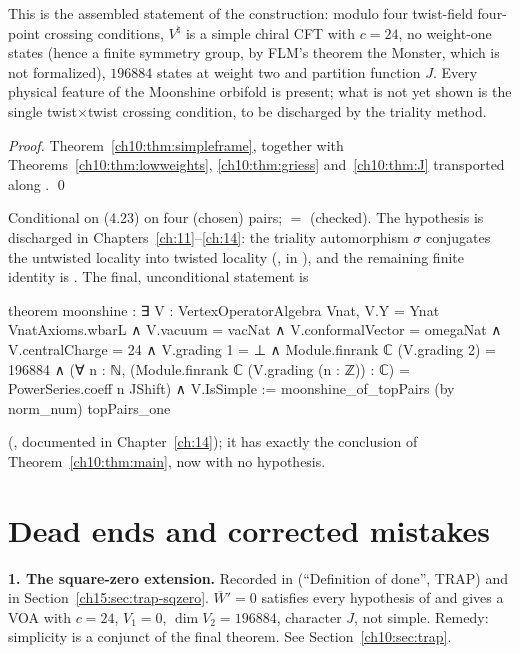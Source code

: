 \begin{physics}
This is the assembled statement of the construction: modulo four twist-field four-point crossing conditions, $V^\natural$ is a simple chiral CFT with $c=24$, no weight-one states (hence a finite symmetry group, by FLM's theorem the Monster, which is not formalized), $196884$ states at weight two and partition function $J$. Every physical feature of the Moonshine orbifold is present; what is not yet shown is the single twist$\times$twist crossing condition, to be discharged by the triality method.
\end{physics}

\emph{Proof.}  Theorem~\ref{ch10:thm:simpleframe}, together with
Theorems~\ref{ch10:thm:lowweights}, \ref{ch10:thm:griess} and~\ref{ch10:thm:J} transported along
. \qed

\begin{status}
Conditional on (4.23) on four (chosen) pairs;  $=$
 (checked).  The hypothesis is discharged in
Chapters~\ref{ch:11}--\ref{ch:14}: the triality automorphism $\sigma$ conjugates the untwisted
locality into twisted locality (,
 in ), and the remaining finite identity is
.  The final, unconditional statement is
\begin{leancode}
theorem moonshine :
    ∃ V : VertexOperatorAlgebra Vnat,
      V.Y = Ynat VnatAxioms.wbarL ∧ V.vacuum = vacNat ∧ V.conformalVector = omegaNat ∧
      V.centralCharge = 24 ∧
      V.grading 1 = ⊥ ∧
      Module.finrank ℂ (V.grading 2) = 196884 ∧
      (∀ n : ℕ, (Module.finrank ℂ (V.grading (n : ℤ)) : ℂ) = PowerSeries.coeff n JShift) ∧
      V.IsSimple :=
  moonshine_of_topPairs (by norm_num) topPairs_one
\end{leancode}
(, documented in Chapter~\ref{ch:14}); it has exactly the
conclusion of Theorem~\ref{ch10:thm:main}, now with no hypothesis.
\end{status}

\section{Dead ends and corrected mistakes}\label{ch10:sec:deadends}

\begin{warning}
\textbf{1. The square-zero extension.}
Recorded in  (``Definition of done'', TRAP) and in Section~\ref{ch15:sec:trap-sqzero}.  $\overline W'=0$ satisfies every hypothesis of 
and gives a VOA with $c=24$, $V_1=0$, $\dim V_2=196884$, character $J$, not simple.  Remedy:
simplicity is a conjunct of the final theorem.  See Section~\ref{ch10:sec:trap}.
\end{warning}

